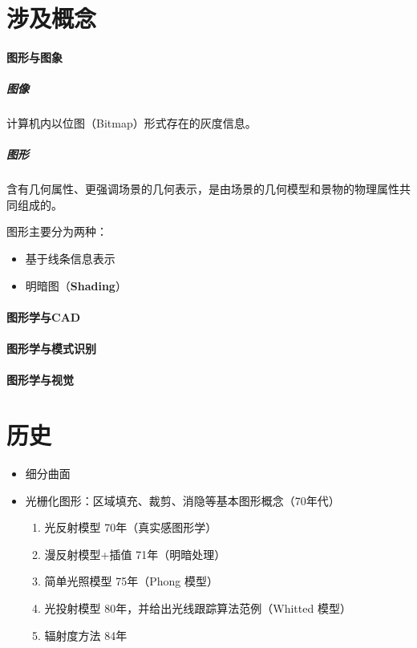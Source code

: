 \documentclass[UTF8,a4paper,12pt]{ctexbook}
\begin{document}
	\section{涉及概念}
		\paragraph{图形与图象}
			\subparagraph{图像}
				计算机内以位图（Bitmap）形式存在的灰度信息。
		
			\subparagraph{图形}
				含有几何属性、更强调场景的几何表示，是由场景的几何模型和景物的物理属性共同组成的。
				
				图形主要分为两种：
				\begin{itemize}[itemindent = 1em]
					\item 基于线条信息表示
					\item 明暗图（\textbf{Shading}）
				\end{itemize}
		
		\paragraph{图形学与CAD}
		\paragraph{图形学与模式识别}
		\paragraph{图形学与视觉}

	\section{历史}
		\begin{itemize}
			\item 细分曲面
			\item 光栅化图形：区域填充、裁剪、消隐等基本图形概念（70年代）
			\begin{enumerate}
				\item 光反射模型 70年（真实感图形学）
				\item 漫反射模型+插值 71年（明暗处理）
				\item 简单光照模型 75年（Phong 模型）
				\item 光投射模型 80年，并给出光线跟踪算法范例（Whitted 模型）
				\item 辐射度方法 84年
			\end{enumerate}

		\end{itemize}
		
\end{document}
